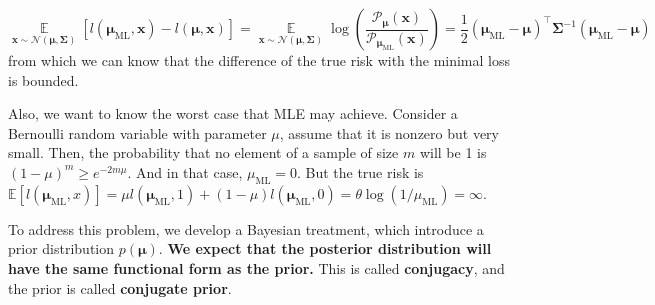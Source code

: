 \documentclass{article}
\begin{document}
	\begin{equation*}
\mathop{\mathbb{E}}\limits_{\bm{x}\sim\mathcal{N}(\bm{\mu}, \bm{\Sigma})}[l(\bm{\mu}_{\mathrm{ML}}, \bm{x})- l(\bm{\mu}, \bm{x})] =
\mathop{\mathbb{E}}\limits_{\bm{x}\sim\mathcal{N}(\bm{\mu}, \bm{\Sigma})}  \log \left( \frac{\mathcal{P}_{\bm{\mu}}(\bm{x})}{\mathcal{P}_{\bm{\mu}_{\mathrm{ML}}}(\bm{x})}\right)
	= \frac{1}{2} (\bm{\mu}_{\mathrm{ML}}-\bm{\mu})^\top \bm{\Sigma}^{-1}(\bm{\mu}_{\mathrm{ML}}-\bm{\mu})
	\end{equation*}
from which we can know that the difference of the true risk with the minimal loss is bounded.

	Also, we want to know the worst case that MLE may achieve. Consider a Bernoulli random variable with parameter $\mu$, assume that it is nonzero but very small. Then, the probability that no element of a sample of size $m$ will be 1 is $(1-\mu)^m\geq e^{-2m\mu}$. And in that case, $\mu_{\mathrm{ML}}=0$. But the true risk is $\mathbb{E}[l(\bm{\mu}_{\mathrm{ML}}, x)]=\mu l(\bm{\mu}_{\mathrm{ML}}, 1) + (1-\mu) l(\bm{\mu}_{\mathrm{ML}}, 0) = \theta \log (1/\mu_{\mathrm{ML}}) = \infty$.
	
	To address this problem, we develop a Bayesian treatment, which introduce a prior distribution $p(\bm{\mu})$. \textbf{We expect that the posterior distribution will have the same functional form as the prior.} This is called \textbf{conjugacy}, and the prior is called \textbf{conjugate prior}.
	
\end{document}
